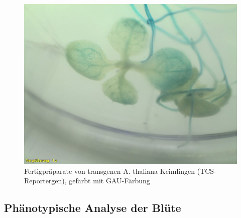 \documentclass[10pt,a4paper]{article}
\begin{document}
			\begin{figure}[H]
			\centering
			\includegraphics[scale=0.3]{TCS_DP_O+A.jpg}
			\caption{Fertigpräparate von transgenen A. thaliana Keimlingen (TCS-Reportergen), gefärbt mit GAU-Färbung}
			\label{fig:cytokinin_Dauerpräparat}
		\end{figure}	
	\subsection{Phänotypische Analyse der Blüte}
	
\end{document}
